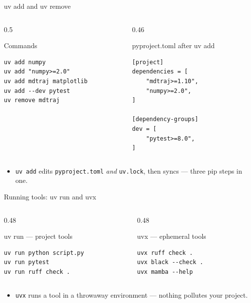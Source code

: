 \documentclass[aspectratio=169]{beamer}
\begin{document}
\begin{frame}[fragile]{uv add and uv remove}
  \begin{columns}[T]
    \begin{column}{0.5\textwidth}
      \begin{block}{Commands}
        \begin{lstlisting}
uv add numpy
uv add "numpy>=2.0"
uv add mdtraj matplotlib
uv add --dev pytest
uv remove mdtraj
        \end{lstlisting}
      \end{block}
    \end{column}
    \begin{column}{0.46\textwidth}
      \begin{block}{pyproject.toml after uv add}
        \begin{lstlisting}
[project]
dependencies = [
    "mdtraj>=1.10",
    "numpy>=2.0",
]

[dependency-groups]
dev = [
    "pytest>=8.0",
]
        \end{lstlisting}
      \end{block}
    \end{column}
  \end{columns}
  \vspace{0.2cm}
  \begin{itemize}
    \item \texttt{uv add} edits \texttt{pyproject.toml} \emph{and} \texttt{uv.lock},
          then syncs --- three pip steps in one.
  \end{itemize}
\end{frame}

\begin{frame}[fragile]{Running tools: uv run and uvx}
  \begin{columns}[T]
    \begin{column}{0.48\textwidth}
      \begin{block}{uv run --- project tools}
        \begin{lstlisting}
uv run python script.py
uv run pytest
uv run ruff check .
        \end{lstlisting}
      \end{block}
    \end{column}
    \begin{column}{0.48\textwidth}
      \begin{block}{uvx --- ephemeral tools}
        \begin{lstlisting}
uvx ruff check .
uvx black --check .
uvx mamba --help
        \end{lstlisting}
      \end{block}
    \end{column}
  \end{columns}
  \vspace{0.2cm}
  \begin{itemize}
    \item \texttt{uvx} runs a tool in a throwaway environment --- nothing
          pollutes your project.
  \end{itemize}
\end{frame}
\end{document}

